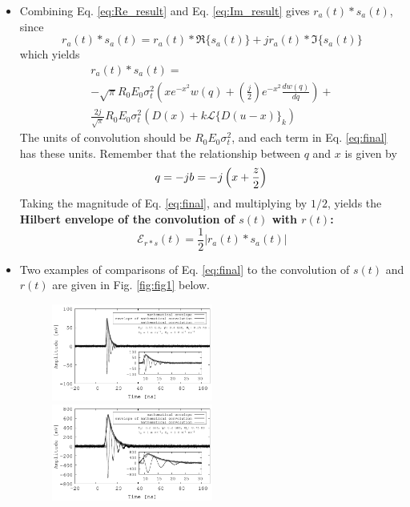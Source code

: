 \documentclass[amsmath,amssymb,aps,prd,10pt,twocolumn,showkeys]{revtex4}
\begin{document}
\begin{itemize}
\item Combining Eq. \ref{eq:Re_result} and Eq. \ref{eq:Im_result} gives $r_a(t) * s_a(t)$, since
\begin{equation}
r_a(t) * s_a(t) = r_a(t) * \Re\lbrace s_a(t)\rbrace + j r_a(t) * \Im\lbrace s_a(t)\rbrace
\end{equation}
which yields
\begin{multline}
r_a(t) * s_a(t) = \\ -\sqrt{\pi} R_0 E_0 \sigma_t^2 \left(x e^{-x^2} w(q) + \left(\frac{j}{2}\right) e^{-x^2} \frac{dw(q)}{dq} \right) + \\ \frac{2j}{\sqrt{\pi}} R_0 E_0 \sigma_t^2 \left(D(x) + k\mathcal{L}\lbrace D(u-x)\rbrace_k\right) \label{eq:final}
\end{multline}
The units of convolution should be $R_0 E_0\sigma_t^2$, and each term in Eq. \ref{eq:final} has these units.  Remember that the relationship between $q$ and $x$ is given by
\begin{equation}
q = -jb = -j\left(x + \frac{z}{2}\right) \\
\end{equation}
Taking the magnitude of Eq. \ref{eq:final}, and multiplying by $1/2$, yields the \textbf{Hilbert envelope of the convolution of $s(t)$ with $r(t)$:}
\begin{equation}
\mathcal{E}_{r * s}(t) = \frac{1}{2} | r_a(t) * s_a(t) |
\end{equation}
\item Two examples of comparisons of Eq. \ref{eq:final} to the convolution of $s(t)$ and $r(t)$ are given in Fig. \ref{fig:fig1} below.
\begin{figure}[hb]
\centering
\includegraphics[width=0.5\textwidth]{March12_plot1.pdf}
\includegraphics[width=0.5\textwidth]{March12_plot2.pdf}

\end{figure}
\end{itemize}
\end{document}
